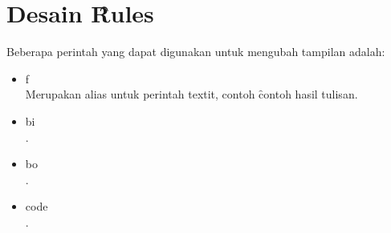 \section{Desain \f{Rules}}
Beberapa perintah yang dapat digunakan untuk mengubah tampilan adalah: 
\begin{itemize}
	\item \bslash f \\
		Merupakan alias untuk perintah \bslash textit, contoh 
		\f{contoh hasil tulisan}.
	\item \bslash bi \\
		.
	\item \bslash bo \\
		.
	\item \bslash code \\ 
		.
\end{itemize}
